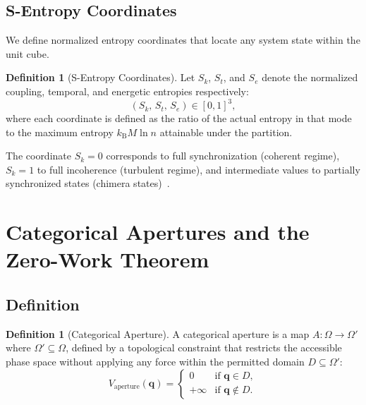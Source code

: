 \documentclass[10pt,twocolumn]{article}
\theoremstyle{definition}
\newtheorem{definition}[theorem]{Definition}
\theoremstyle{remark}
\newcommand{\kB}{k_{\mathrm{B}}}
\begin{document}
\subsection{S-Entropy Coordinates}

We define normalized entropy coordinates that locate any system
state within the unit cube.

\begin{definition}[S-Entropy Coordinates]\label{def:sentropy}
Let $S_k$, $S_t$, and $S_e$ denote the normalized coupling,
temporal, and energetic entropies respectively:
\begin{equation}
  (S_k,\, S_t,\, S_e) \in [0,1]^3,
\end{equation}
where each coordinate is defined as the ratio of the actual entropy
in that mode to the maximum entropy $\kB M \ln n$ attainable
under the partition.
\end{definition}

The coordinate $S_k = 0$ corresponds to full synchronization
(coherent regime), $S_k = 1$ to full incoherence (turbulent regime),
and intermediate values to partially synchronized states
(chimera states)~\cite{Panaggio2015}.

\section{Categorical Apertures and the Zero-Work Theorem}\label{sec:apertures}

\subsection{Definition}

\begin{definition}[Categorical Aperture]\label{def:aperture}
A categorical aperture is a map $A\colon \Omega \to \Omega'$
where $\Omega' \subseteq \Omega$, defined by a topological
constraint that restricts the accessible phase space without
applying any force within the permitted domain $D \subseteq \Omega'$:
\begin{equation}
  V_{\text{aperture}}(\mathbf{q}) =
  \begin{cases}
    0 & \text{if } \mathbf{q} \in D, \\
    +\infty & \text{if } \mathbf{q} \notin D.
  \end{cases}
\end{equation}
\end{definition}
\end{document}
